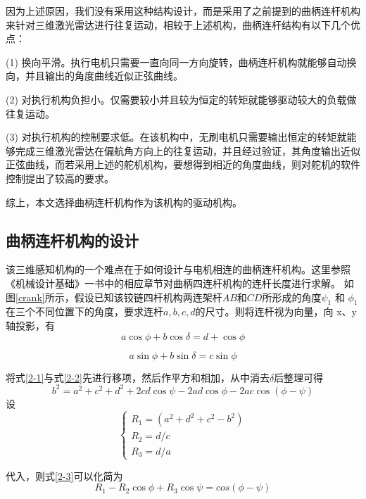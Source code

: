 因为上述原因，我们没有采用这种结构设计，而是采用了之前提到的曲柄连杆机构来针对三维激光雷达进行往复运动，相较于上述机构，曲柄连杆结构有以下几个优点：

(1) 换向平滑。执行电机只需要一直向同一方向旋转，曲柄连杆机构就能够自动换向，并且输出的角度曲线近似正弦曲线。

(2) 对执行机构负担小。仅需要较小并且较为恒定的转矩就能够驱动较大的负载做往复运动。

(3) 对执行机构的控制要求低。在该机构中，无刷电机只需要输出恒定的转矩就能够完成三维激光雷达在偏航角方向上的往复运动，并且经过验证，其角度输出近似正弦曲线，而若采用上述的舵机机构，要想得到相近的角度曲线，则对舵机的软件控制提出了较高的要求。

综上，本文选择曲柄连杆机构作为该机构的驱动机构。

\subsection{曲柄连杆机构的设计}
该三维感知机构的一个难点在于如何设计与电机相连的曲柄连杆机构。这里参照《机械设计基础》一书中的相应章节对曲柄四连杆机构的连杆长度进行求解。
如图\ref{crank}所示，假设已知该铰链四杆机构两连架杆$AB$和$CD$所形成的角度$\psi_1$ 和 $\phi_1$在三个不同位置下的角度，要求连杆$a,b,c,d$的尺寸。则将连杆视为向量，向 x、y轴投影，有
\begin{equation}
    a\cos\phi + b\cos\delta = d + \cos\phi
    \label{2-1}
\end{equation}

\begin{equation}
    a\sin\phi + b\sin\delta = c\sin\phi
    \label{2-2}
\end{equation}

将式\ref{2-1}与式\ref{2-2}先进行移项，然后作平方和相加，从中消去$\delta$后整理可得
\begin{equation}
b^2 = a^2 + c^2 + d^2 + 2cd\cos\psi -2ad\cos\phi -2ac\cos(\phi - \psi)
\label{2-3}
\end{equation}
设
$$ 
\begin{cases}
R_1=(a^2 + d^2 + c^2 - b^2) \\
R_2=d/c \\
R_3=d/a
\end{cases}
$$

代入，则式\ref{2-3}可以化简为
\begin{equation}
    R_1-R_2\cos\phi + R_3\cos\psi=cos(\phi-\psi)
\end{equation}

